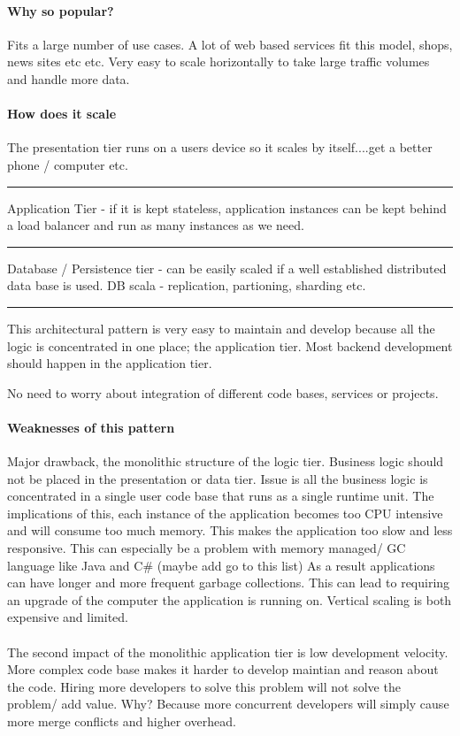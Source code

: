 \documentclass[a4paper, 11pt]{book}
\begin{document}
    \paragraph{Why so popular?}
    Fits a large number of use cases.
    A lot of web based services fit this model, shops, news sites etc etc.
    Very easy to scale horizontally to take large traffic volumes and handle more data.

    \paragraph{How does it scale}
    The presentation tier runs on a users device so it scales by itself....get a better phone / computer etc.
    \hrule
    Application Tier - if it is kept stateless, application instances can be kept behind a load balancer and run as many instances as we need.
    \hrule
    Database / Persistence tier - can be easily scaled if a well established distributed data base is used. DB scala - replication, partioning, sharding etc.

    \hrule
    This architectural pattern is very easy to maintain and develop because all the logic is concentrated in one place; the application tier.
    Most backend development should happen in the application tier.

    No need to worry about integration of different code bases, services or projects.

    \paragraph{Weaknesses of this pattern}

    Major drawback, the monolithic structure of the logic tier.
    Business logic should not be placed in the presentation or data tier.
    Issue is all the business logic is concentrated in a single user code base that runs as a single runtime unit.
    The implications of this, each instance of the application becomes too CPU intensive and will consume too much memory.
    This makes the application too slow and less responsive.
    This can especially be a problem with memory managed/ GC language like Java and C\# (maybe add go to this list)
    As a result applications can have longer and more frequent garbage collections.
    This can lead to requiring an upgrade of the computer the application is running on.
    Vertical scaling is both expensive and limited.

    \paragraph{}
    The second impact of the monolithic application tier is low development velocity.
    More complex code base makes it harder to develop maintian and reason about the code.
    Hiring more developers to solve this problem will not solve the problem/ add value.
    Why?
    Because more concurrent developers will simply cause more merge conflicts and higher overhead.
\end{document}
